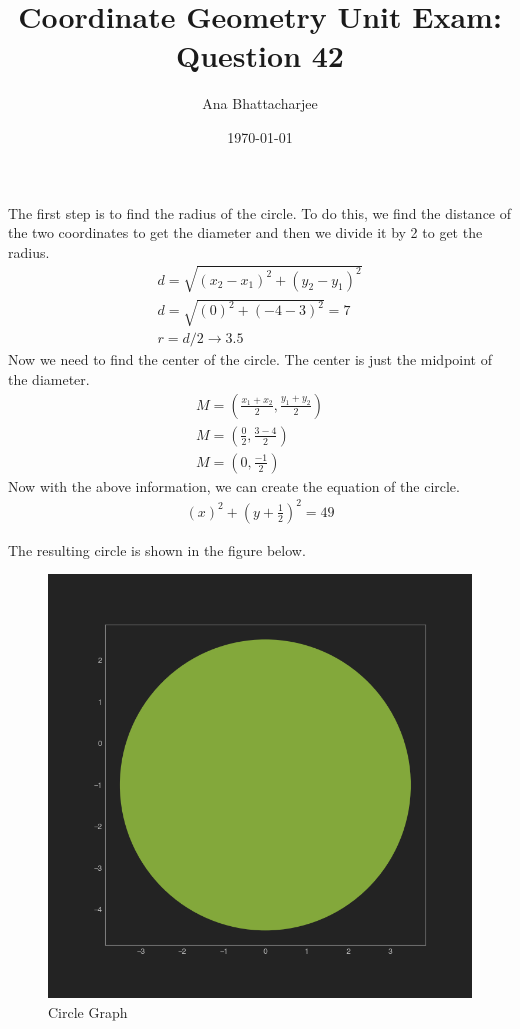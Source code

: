 \documentclass{article}
\begin{document}
\title{Coordinate Geometry Unit Exam: Question 42}
\author{Ana Bhattacharjee}
\date{\today}
\maketitle{}

\begin{center}
The first step is to find the radius of the circle. To do this, we find the distance of the two coordinates to get the diameter and then we divide it by 2 to get the radius.
\begin{align}
  d = \sqrt{(x_2 - x_1)^2 + (y_2 - y_1)^2} \\
  d = \sqrt{(0)^2 + (-4 - 3)^2} = 7 \\
  r = d / 2 \rightarrow 3.5
\end{align}
Now we need to find the center of the circle. The center is just the midpoint of the diameter.
\begin{align}
  M = (\frac{x_1 + x_2}{2}, \frac{y_1 + y_2}{2}) \\
  M = (\frac{0}{2}, \frac{3 - 4}{2}) \\
  M = (0, \frac{-1}{2})
\end{align}
Now with the above information, we can create the equation of the circle.
\begin{align}
  (x)^2 + (y + \frac{1}{2})^2 = 49
\end{align}
\par
The resulting circle is shown in the figure below.
\begin{figure}[!htbp]
  \includegraphics[width=1.0\columnwidth]{circle}
  \caption{Circle Graph}
\end{figure}
\end{center}
\end{document}
